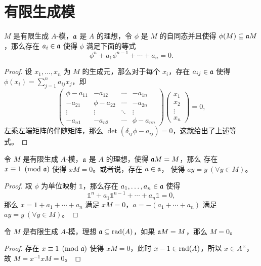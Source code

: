 \section{有限生成模}

\begin{proposition}\label{prop:cayley}
  $M$ 是有限生成 $A$-模，$\mathfrak{a}$ 是 $A$ 的理想，令 $\phi$ 是 $M$ 的自同态并且使得
  $\phi(M)\subseteq \mathfrak{a}M$，那么存在 $a_i\in\mathfrak{a}$ 使得 $\phi$ 满足下面的等式
  \[
    \phi^n+a_1\phi^{n-1}+\cdots+a_n=0.  
  \]
\end{proposition}
\begin{proof}
  设 $x_1,\dots,x_n$ 为 $M$ 的生成元，那么对于每个 $x_i$，存在 $a_{ij}\in\mathfrak{a}$
  使得 $\phi(x_i)=\sum_{j=1}^n a_{ij}x_j$，即
  \[
    \begin{pmatrix}
      \phi-a_{11} & -a_{12} & \cdots & -a_{1n} \\
      -a_{21} & \phi-a_{22} & \cdots & -a_{2n} \\
      \vdots & \vdots & \ddots & \vdots \\
      -a_{n1} & -a_{n2} & \cdots & \phi-a_{nn}
    \end{pmatrix}  
    \begin{pmatrix}
      x_1 \\ x_2\\\vdots \\ x_n 
    \end{pmatrix}=0,
  \]
  左乘左端矩阵的伴随矩阵，那么 $\det(\delta_{ij}\phi-a_{ij})=0$，这就给出了上述等式。
\end{proof}

\begin{corollary}
  令 $M$ 是有限生成 $A$-模，$\mathfrak{a}$ 是 $A$ 的理想，使得 $\mathfrak{a}M=M$，那么
  存在 $x\equiv 1\pmod{\mathfrak{a}}$ 使得 $xM=0$。或者说，存在 $a\in\mathfrak{a}$，
  使得 $ay=y\ (\forall y\in M)$。
\end{corollary}
\begin{proof}
  取 $\phi$ 为单位映射 $\mathbb{1}$，那么存在 $a_1,\dots,a_n\in\mathfrak{a}$
  使得
  \[
    \mathbb{1}^n+a_1\mathbb{1}^{n-1}+\cdots+a_n\mathbb{1}=0,  
  \]
  那么 $x=1+a_1+\cdots+a_n$ 满足 $xM=0$，$a=-(a_1+\cdots+a_n)$ 满足 $ay=y\ (\forall y\in M)$。
\end{proof}

\begin{proposition}[Nakayama 引理]
  令 $M$ 是有限生成 $A$-模，理想 $\mathfrak{a}\subseteq\operatorname{rad}(A)$，如果
  $\mathfrak{a}M=M$，那么 $M=0$。
\end{proposition}
\begin{proof}
  存在 $x\equiv 1\pmod{\mathfrak{a}}$ 使得 $xM=0$，此时 $x-1\in\operatorname{rad} (A)$，所以
  $x\in A^\times $，故 $M=x^{-1}xM=0$。
\end{proof}

